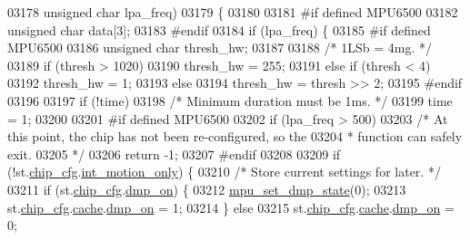 \begin{DoxyCode}
{{{{{{{{{{{{{{{{{{{{{{{{{{{{{{{{{{03178     \textcolor{keywordtype}{unsigned} \textcolor{keywordtype}{char} lpa\_freq)
03179 \{
03180 
03181 \textcolor{preprocessor}{#if defined MPU6500}
03182     \textcolor{keywordtype}{unsigned} \textcolor{keywordtype}{char} data[3];
03183 \textcolor{preprocessor}{#endif}
03184     \textcolor{keywordflow}{if} (lpa\_freq) \{
03185 \textcolor{preprocessor}{#if defined MPU6500}
03186         \textcolor{keywordtype}{unsigned} \textcolor{keywordtype}{char} thresh\_hw;
03187 
03188         \textcolor{comment}{/* 1LSb = 4mg. */}
03189         \textcolor{keywordflow}{if} (thresh > 1020)
03190             thresh\_hw = 255;
03191         \textcolor{keywordflow}{else} \textcolor{keywordflow}{if} (thresh < 4)
03192             thresh\_hw = 1;
03193         \textcolor{keywordflow}{else}
03194             thresh\_hw = thresh >> 2;
03195 \textcolor{preprocessor}{#endif}
03196 
03197         \textcolor{keywordflow}{if} (!time)
03198             \textcolor{comment}{/* Minimum duration must be 1ms. */}
03199             time = 1;
03200 
03201 \textcolor{preprocessor}{#if defined MPU6500}
03202         \textcolor{keywordflow}{if} (lpa\_freq > 500)
03203             \textcolor{comment}{/* At this point, the chip has not been re-configured, so the}
03204 \textcolor{comment}{             * function can safely exit.}
03205 \textcolor{comment}{             */}
03206             \textcolor{keywordflow}{return} -1;
03207 \textcolor{preprocessor}{#endif}
03208 
03209         \textcolor{keywordflow}{if} (!st.\hyperlink{structgyro__state__s_ac895217592e2084bd520b0be8e9d20ee}{chip\_cfg}.\hyperlink{structchip__cfg__s_a28c5c373e0d7189a11c4ae5ca351ca30}{int\_motion\_only}) \{
03210             \textcolor{comment}{/* Store current settings for later. */}
03211             \textcolor{keywordflow}{if} (st.\hyperlink{structgyro__state__s_ac895217592e2084bd520b0be8e9d20ee}{chip\_cfg}.\hyperlink{structchip__cfg__s_a49fb51079238683b21264827348b5968}{dmp\_on}) \{
03212                 \hyperlink{group___d_r_i_v_e_r_s_ga68ed20e6c9663cd7c50469329af8715f}{mpu\_set\_dmp\_state}(0);
03213                 st.\hyperlink{structgyro__state__s_ac895217592e2084bd520b0be8e9d20ee}{chip\_cfg}.\hyperlink{structchip__cfg__s_aab21a113d97da9c015f6f1928662927b}{cache}.\hyperlink{structmotion__int__cache__s_a49fb51079238683b21264827348b5968}{dmp\_on} = 1;
03214             \} \textcolor{keywordflow}{else}
03215                 st.\hyperlink{structgyro__state__s_ac895217592e2084bd520b0be8e9d20ee}{chip\_cfg}.\hyperlink{structchip__cfg__s_aab21a113d97da9c015f6f1928662927b}{cache}.\hyperlink{structmotion__int__cache__s_a49fb51079238683b21264827348b5968}{dmp\_on} = 0;
}}}}}}}}}}}}}}}}}}}}}}}}}}}}}}}}}}
\end{DoxyCode}
